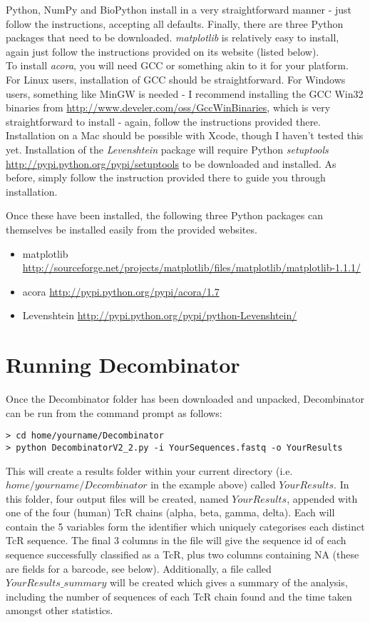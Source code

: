 \documentclass[10pt]{article}
\begin{document}
Python, NumPy and BioPython install in a very straightforward manner - just follow the instructions,
accepting all defaults. Finally, there are three Python packages that need to be downloaded. \emph{matplotlib} is relatively easy to install, again just follow the instructions provided on its website (listed below).
\\
To install \emph{acora}, you will need GCC or something akin to it for your platform. For Linux users, installation of GCC should be straightforward. For Windows users, something like MinGW is needed - I recommend installing the GCC Win32 binaries from \url{http://www.develer.com/oss/GccWinBinaries}, which is very straightforward to install - again, follow the instructions provided there. Installation on a Mac should be possible with Xcode, though I haven't tested this yet. Installation of the \emph{Levenshtein} package will require Python \emph{setuptools} \url{http://pypi.python.org/pypi/setuptools} to be downloaded and installed. As before, simply follow the instruction provided there to guide you through installation.

Once these have been installed, the following three Python packages can themselves be installed easily from the provided websites.

\begin{itemize}
\item matplotlib \url{http://sourceforge.net/projects/matplotlib/files/matplotlib/matplotlib-1.1.1/}
\item acora \url{http://pypi.python.org/pypi/acora/1.7}
\item Levenshtein \url{http://pypi.python.org/pypi/python-Levenshtein/}
\end{itemize}
\section*{Running Decombinator}
Once the Decombinator folder has been downloaded and unpacked, Decombinator can be run from the command prompt as follows:

\footnotesize
\begin{verbatim}
> cd home/yourname/Decombinator
> python DecombinatorV2_2.py -i YourSequences.fastq -o YourResults
\end{verbatim}
\normalsize

This will create a results folder within your current directory (i.e. $home/yourname/Decombinator$ in the example above) called $YourResults$. In this folder, four output files will be created, named $YourResults$, appended with one of the four (human) TcR chains (alpha, beta, gamma, delta). Each will contain the 5 variables form the identifier which uniquely categorises each distinct TcR sequence. The final 3 columns in the file will give the sequence id of each sequence successfully classified as a TcR, plus two columns containing NA (these are fields for a barcode, see below). Additionally, a file called $YourResults\_summary$ will be created which gives a summary of the analysis, including the number of sequences of each TcR chain found and the time taken amongst other statistics.
\end{document}
